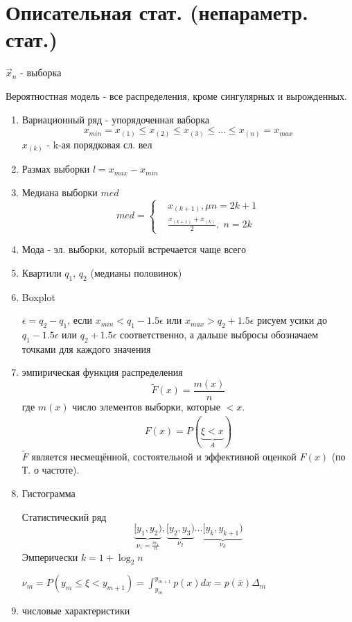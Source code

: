\documentclass{article}
\begin{document}
\section{Описательная стат. (непараметр. стат.)}
$\vec{x}_n$ - выборка

Вероятностная модель - все распределения, кроме сингулярных и вырожденных.
\begin{enumerate}
  \item Вариационный ряд - упорядоченная ваборка
    \[
      x_{min}=x_{(1)}\le x_{(2)}\le x_{(3)} \le \dots \le x_{(n)}=x_{max}
    \]
    $x_{(k)}$ - k-ая порядковая сл. вел
  \item Размах выборки $l=x_{max}-x_{min}$
  \item Медиана выборки $med$
    \[
      med =\left\{\begin{aligned}
        & x_{(k+1)}, \mu n=2k+1 \\ 
        & \frac{x_{(k+1)}+x_{(k)}}{2}, \; n=2k
      \end{aligned}\right.
    \]
  \item Мода - эл. выборки, который встречается чаще всего
  \item Квартили $q_1$, $q_2$ (медианы половинок)
  \item Boxplot

    $\epsilon=q_2-q_1$, если $x_{min}<q_1-1.5\epsilon$ или $x_{max}>q_2+1.5\epsilon$
    рисуем усики до $q_1-1.5\epsilon$ или $q_2+1.5\epsilon$ соответственно,
    а дальше выбросы обозначаем точками для каждого значения
  \item эмпирическая функция распределения
    \[
      \tilde{F}(x)=\frac{m(x)}{n}
    \]
    где $m(x)$ число элементов выборки, которые $<x$.
    \begin{gather*}
      F(x)=P(\underbrace{\xi<x}_{A})
    \end{gather*}
    $\tilde{F}$ является несмещённой, состоятельной и эффективной оценкой $F(x)$
    (по Т. о частоте).
  \item Гистограмма

    Статистический ряд
    \[
      \underbrace{[y_1,y_2)}_{\nu_1=\frac{m_1}{n}}, \underbrace{[y_2,y_3)}_{\nu_2}\dots \underbrace{[y_k,y_{k+1})}_{\nu_k}
    \]
    Эмперически $k=1+\log_2 n$
    
    
    $\nu_m=P(y_m \le \xi < y_{m+1})=\int_{y_m}^{y_{m+1}}p(x)dx=p(\bar{x})\Delta_m$
  \item числовые характеристики


\end{enumerate}
\end{document}
